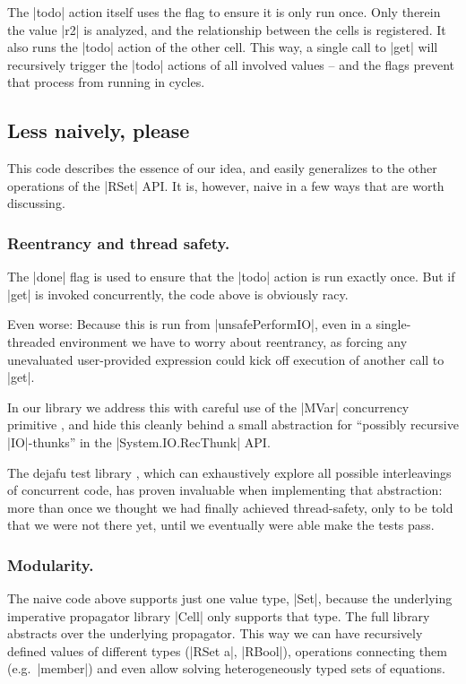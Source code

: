 \documentclass[manuscript,screen,acmsmall,nonacm]{acmart}
\begin{document}
The |todo| action itself uses the flag to ensure it is only run once. Only therein the value |r2| is analyzed, and the relationship between the cells is registered. It also runs the |todo| action of the other cell. This way, a single call to |get| will recursively trigger the |todo| actions of all involved values -- and the flags prevent that process from running in cycles.

\subsection{Less naively, please}

This code describes the essence of our idea, and easily generalizes to the other operations of the |RSet| API. It is, however, naive in a few ways that are worth discussing.

\subsubsection{Reentrancy and thread safety.}\label{sec:thread}

The |done| flag is used to ensure that the |todo| action is run exactly once. But if |get| is invoked concurrently, the code above is obviously racy.

Even worse: Because this is run from |unsafePerformIO|, even in a single-threaded environment we have to worry about reentrancy, as forcing any unevaluated user-provided expression could kick off execution of another call to |get|.

In our library we address this with careful use of the |MVar| concurrency primitive \cite{concurrent}, and hide this cleanly behind a small abstraction for “possibly recursive |IO|-thunks” in the |System.IO.RecThunk| API.

The dejafu test library \citep{dejafu}, which can exhaustively explore all possible interleavings of concurrent code, has proven invaluable when implementing that abstraction: more than once we thought we had finally achieved thread-safety, only to be told that we were not there yet, until we eventually were able make the tests pass.

\subsubsection{Modularity.}

The naive code above supports just one value type, |Set|, because the underlying imperative propagator library |Cell| only supports that type. The full library abstracts over the underlying propagator. This way we can have recursively defined values of different types (|RSet a|, |RBool|), operations connecting them (e.g.\ |member|) and even allow solving heterogeneously typed sets of equations.
\end{document}
